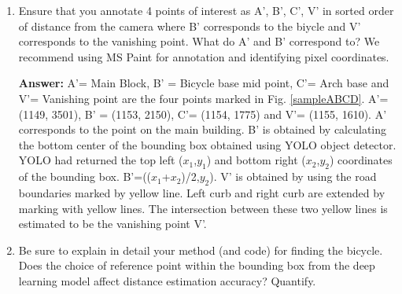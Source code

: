 \begin{enumerate}
\begin{studentSpace}
\end{studentSpace}

\item Ensure that you annotate 4 points of interest as A', B', C', V'  in sorted order of distance from the camera where B' corresponds to the biycle and V' corresponds to the vanishing point.  What do A' and B' correspond to?
We recommend using MS Paint for annotation and identifying pixel coordinates.
\begin{studentSpace}

\textbf{Answer:} 
A'= Main Block, B' = Bicycle base mid point, C'= Arch base and V'= Vanishing point are the four points marked in Fig. \ref{sampleABCD}. A'= (1149, 3501), B' = (1153, 2150), C'= (1154, 1775) and V'= (1155, 1610). A' corresponds to the point on the main building. B' is obtained by calculating the bottom center of the bounding box obtained using YOLO object detector. YOLO had returned the top left ($x_{1}$,$y_{1}$) and bottom right ($x_{2}$,$y_{2}$) coordinates of the bounding box. B'=(($x_{1}$+$x_{2}$)/2,$y_{2}$). V' is obtained by using the road boundaries marked by yellow line. Left curb and right curb are extended by marking with yellow lines. The intersection between these two yellow lines is estimated to be the vanishing point V'.
\end{studentSpace}

\item Be sure to  explain in detail your method (and code) for finding the bicycle. Does the choice of reference point within the bounding box from the deep learning model affect distance estimation accuracy? Quantify.
\end{enumerate}
